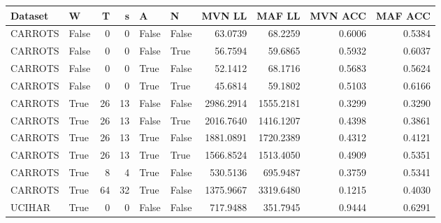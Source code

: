 \documentclass[11pt,titlepage,oneside,openany]{book}
\begin{document}
\begin{table}
\tiny
\begin{tabularx}{\textwidth}{llrrllrrrr}
	\toprule
	Dataset &  W &  T &  s &  A &  N &    MVN LL &    MAF LL &  MVN ACC &  MAF ACC \\
	\midrule
	CARROTS &   False &       0 &       0 &    False &  False &   63.0739 &   68.2259 &   0.6006 &   0.5384 \\
	CARROTS &   False &       0 &       0 &    False &   True &   56.7594 &   59.6865 &   0.5932 &   0.6037 \\
	CARROTS &   False &       0 &       0 &     True &  False &   52.1412 &   68.1716 &   0.5683 &   0.5624 \\
	CARROTS &   False &       0 &       0 &     True &   True &   45.6814 &   59.1802 &   0.5103 &   0.6166 \\
	CARROTS &    True &      26 &      13 &    False &  False & 2986.2914 & 1555.2181 &   0.3299 &   0.3290 \\
	CARROTS &    True &      26 &      13 &    False &   True & 2016.7640 & 1416.1207 &   0.4398 &   0.3861 \\
	CARROTS &    True &      26 &      13 &     True &  False & 1881.0891 & 1720.2389 &   0.4312 &   0.4121 \\
	CARROTS &    True &      26 &      13 &     True &   True & 1566.8524 & 1513.4050 &   0.4909 &   0.5351 \\
	CARROTS &    True &       8 &       4 &     True &  False &  530.5136 &  695.9487 &   0.3759 &   0.5341 \\
	CARROTS &    True &      64 &      32 &     True &  False & 1375.9667 & 3319.6480 &   0.1215 &   0.4030 \\
	UCIHAR &    True &       0 &       0 &    False &  False &  717.9488 &  351.7945 &   0.9444 &   0.6291 \\
	\bottomrule
\end{tabularx}
\end{table}
\end{document}
